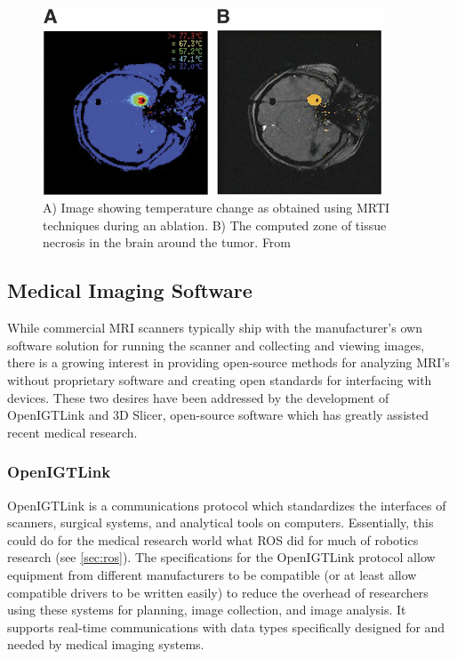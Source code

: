 \documentclass[12pt]{report}
\begin{document}
\begin{figure}[thpb]
	\centering
	\includegraphics[width=4in]{images/mrti_head.png}
    \caption{A) Image showing temperature change as obtained using MRTI techniques during an ablation. B) The computed zone of tissue necrosis in the brain around the tumor. From \cite{mrtiAblation}}
    \label{fig:mrtiExample}
\end{figure}


\subsection{Medical Imaging Software}
While commercial MRI scanners typically ship with the manufacturer's own software solution for running the scanner and collecting and viewing images, there is a growing interest in providing open-source methods for analyzing MRI's without proprietary software and creating open standards for interfacing with devices. These two desires have been addressed by the development of OpenIGTLink and 3D Slicer, open-source software which has greatly assisted recent medical research.

\subsubsection{OpenIGTLink}
OpenIGTLink is a communications protocol which standardizes the interfaces of scanners, surgical systems, and analytical tools on computers. \cite{openIGTLinkPaper} \cite{openIGTLink} Essentially, this could do for the medical research world what ROS did for much of robotics research (see \autoref{sec:ros}). The specifications for the OpenIGTLink protocol allow equipment from different manufacturers to be compatible (or at least allow compatible drivers to be written easily) to reduce the overhead of researchers using these systems for planning, image collection, and image analysis. It supports real-time communications with data types specifically designed for and needed by medical imaging systems.
\end{document}

